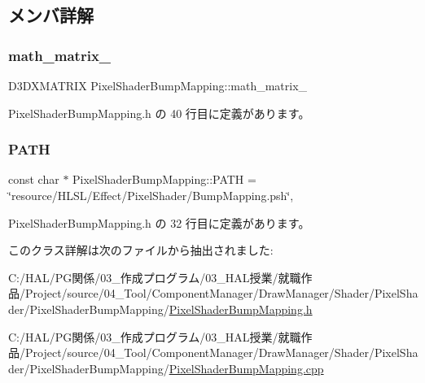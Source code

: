 \subsection{メンバ詳解}
\mbox{\label{class_pixel_shader_bump_mapping_a3c24357ac9611761eece892054847c83}} 
\subsubsection{\texorpdfstring{math\+\_\+matrix\+\_\+}{math\_matrix\_}}
{\footnotesize\ttfamily D3\+D\+X\+M\+A\+T\+R\+IX Pixel\+Shader\+Bump\+Mapping\+::math\+\_\+matrix\+\_\+\hspace{0.3cm}{\ttfamily [private]}}



 Pixel\+Shader\+Bump\+Mapping.\+h の 40 行目に定義があります。

\mbox{\label{class_pixel_shader_bump_mapping_a62c06006cdfad9bc6158b5d779aa732c}} 
\subsubsection{\texorpdfstring{P\+A\+TH}{PATH}}
{\footnotesize\ttfamily const char $\ast$ Pixel\+Shader\+Bump\+Mapping\+::\+P\+A\+TH = \char`\"{}resource/H\+L\+SL/Effect/Pixel\+Shader/Bump\+Mapping.\+psh\char`\"{}\hspace{0.3cm}{\ttfamily [static]}, {\ttfamily [private]}}



 Pixel\+Shader\+Bump\+Mapping.\+h の 32 行目に定義があります。



このクラス詳解は次のファイルから抽出されました\+:\begin{DoxyCompactItemize}
\item 
C\+:/\+H\+A\+L/\+P\+G関係/03\+\_\+作成プログラム/03\+\_\+\+H\+A\+L授業/就職作品/\+Project/source/04\+\_\+\+Tool/\+Component\+Manager/\+Draw\+Manager/\+Shader/\+Pixel\+Shader/\+Pixel\+Shader\+Bump\+Mapping/\mbox{\hyperlink{_pixel_shader_bump_mapping_8h}{Pixel\+Shader\+Bump\+Mapping.\+h}}\item 
C\+:/\+H\+A\+L/\+P\+G関係/03\+\_\+作成プログラム/03\+\_\+\+H\+A\+L授業/就職作品/\+Project/source/04\+\_\+\+Tool/\+Component\+Manager/\+Draw\+Manager/\+Shader/\+Pixel\+Shader/\+Pixel\+Shader\+Bump\+Mapping/\mbox{\hyperlink{_pixel_shader_bump_mapping_8cpp}{Pixel\+Shader\+Bump\+Mapping.\+cpp}}\end{DoxyCompactItemize}
